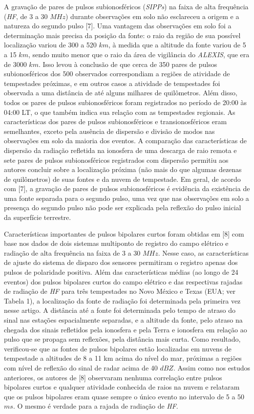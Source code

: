 \documentclass[a4paper, 12pt, onecolumn,singlespacing]{article}
\begin{document}
	A gravação de pares de pulsos subionosféricos (\textit{SIPPs}) na faixa de alta frequência (\textit{HF}, de 3 a 30 $MHz$) durante observações em solo não esclareceu a origem e a natureza do segundo pulso [7]. Uma vantagem das observações em solo foi a determinação mais precisa da posição da fonte: o raio da região de sua possível localização variou de 300 a 520 $km$, à medida que a altitude da fonte variou de 5 a 15 $km$, sendo muito menor que o raio da área de vigilância do \textit{ALEXIS}, que era de 3000 $km$. Isso levou à conclusão de que cerca de 350 pares de pulsos subionosféricos dos 500 observados correspondiam a regiões de atividade de tempestades próximas, e em outros casos a atividade de tempestades foi observada a uma distância de até alguns milhares de quilômetros. Além disso, todos os pares de pulsos subionosféricos foram registrados no período de 20:00 às 04:00 LT, o que também indica sua relação com as tempestades regionais. As características dos pares de pulsos subionosféricos e transionosféricos eram semelhantes, exceto pela ausência de dispersão e divisão de modos nas observações em solo da maioria dos eventos. A comparação das características de dispersão da radiação refletida na ionosfera de uma descarga de raio remota e sete pares de pulsos subionosféricos registrados com dispersão permitiu aos autores concluir sobre a localização próxima (não mais do que algumas dezenas de quilômetros) de suas fontes e da nuvem de tempestade. Em geral, de acordo com [7], a gravação de pares de pulsos subionosféricos é evidência da existência de uma fonte separada para o segundo pulso, uma vez que nas observações em solo a presença do segundo pulso não pode ser explicada pela reflexão do pulso inicial da superfície terrestre.
	
	Características importantes de pulsos bipolares curtos foram obtidas em [8] com base nos dados de dois sistemas multiponto de registro do campo elétrico e radiação de alta frequência na faixa de 3 a 30 $MHz$. Nesse caso, as características de ajuste do sistema de disparo dos sensores permitiram o registro apenas dos pulsos de polaridade positiva. Além das características médias (ao longo de 24 eventos) dos pulsos bipolares curtos do campo elétrico e das respectivas rajadas de radiação de \textit{HF} para três tempestades no Novo México e Texas (EUA; ver Tabela 1), a localização da fonte de radiação foi determinada pela primeira vez nesse artigo. A distância até a fonte foi determinada pelo tempo de atraso do sinal nas estações espacialmente separadas, e a altitude da fonte, pelo atraso na chegada dos sinais refletidos pela ionosfera e pela Terra e ionosfera em relação ao pulso que se propaga sem reflexões, pela distância mais curta. Como resultado, verificou-se que as fontes de pulsos bipolares estão localizadas em nuvens de tempestade a altitudes de 8 a 11 km acima do nível do mar, próximas a regiões com nível de reflexão do sinal de radar acima de 40 $dBZ$. Assim como nos estudos anteriores, os autores de [8] observaram nenhuma correlação entre pulsos bipolares curtos e qualquer atividade conhecida de raios na nuvem e relataram que os pulsos bipolares eram quase sempre o único evento no intervalo de 5 a 50 $ms$. O mesmo é verdade para a rajada de radiação de \textit{HF}.
	
\end{document}
